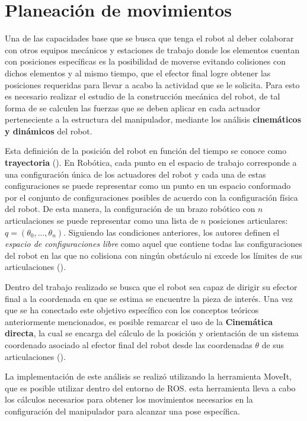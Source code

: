 \chapter{Planeación de movimientos}
Una de las capacidades base que se busca que tenga el robot al deber colaborar con otros equipos mecánicos y estaciones de trabajo donde los elementos cuentan con posiciones específicas es la posibilidad de moverse evitando colisiones con dichos elementos y al mismo tiempo, que el efector final logre obtener las posiciones requeridas para llevar a acabo la actividad que se le solicita. Para esto es necesario realizar el estudio de la construcción mecánica del robot, de tal forma de se calculen las fuerzas que se deben aplicar en cada actuador perteneciente a la estructura del manipulador, mediante los análisis \textbf{cinemáticos y dinámicos} del robot.

Esta definición de la posición del robot en función del tiempo se conoce como \textbf{trayectoria} (\cite*{lynch_modern_2017}). En Robótica, cada punto en el espacio de trabajo corresponde a una configuración única de los actuadores del robot y cada una de estas configuraciones se puede representar como un punto en un espacio conformado por el conjunto de configuraciones posibles de acuerdo con la configuración física del robot. De esta manera, la configuración de un brazo robótico con $n$ articulaciones se puede representar como una lista de $n$ posiciones articulares: $q = (\theta_{0},...,\theta_{n})$. Siguiendo las condiciones anteriores, los autores definen el \textit{espacio de configuraciones libre} como aquel que contiene todas las configuraciones del robot en las que no colisiona con ningún obstáculo ni excede los límites de sus articulaciones (\cite*{lynch_modern_2017}).

Dentro del trabajo realizado se busca que el robot sea capaz de dirigir su efector final a la coordenada en que se estima se encuentre la pieza de interés. Una vez que se ha conectado este objetivo específico con los conceptos teóricos anteriormente mencionados, es posible remarcar el uso de la \textbf{Cinemática directa}, la cual se encarga del cálculo de la posición y orientación de un sistema coordenado asociado al efector final del robot desde las coordenadas $\theta$ de sus articulaciones (\cite{lynch_modern_2017}).

La implementación de este análisis se realizó utilizando la herramienta MoveIt, que es posible utilizar dentro del entorno de ROS. esta herramienta lleva a cabo los cálculos necesarios para obtener los movimientos necesarios en la configuración del manipulador para alcanzar una pose específica. 

